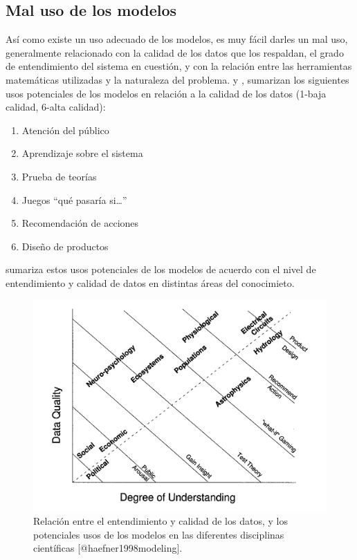 \documentclass[
]{book}
\providecommand{\tightlist}{%
  \setlength{\itemsep}{0pt}\setlength{\parskip}{0pt}}
\begin{document}
\hypertarget{mal-uso-de-los-modelos}{%
\subsection{Mal uso de los modelos}\label{mal-uso-de-los-modelos}}

Así como existe un uso adecuado de los modelos, es muy fácil darles un mal uso, generalmente relacionado con la calidad de los datos que los respaldan, el grado de entendimiento del sistema en cuestión, y con la relación entre las herramientas matemáticas utilizadas y la naturaleza del problema. \citet{holling1978adaptive} y \citet{karplus1975place}, sumarizan los siguientes usos potenciales de los modelos en relación a la calidad de los datos (1-baja calidad, 6-alta calidad):

\begin{enumerate}
\def\labelenumi{\arabic{enumi}.}
\tightlist
\item
  Atención del público
\item
  Aprendizaje sobre el sistema
\item
  Prueba de teorías
\item
  Juegos ``qué pasaría si\ldots{}''
\item
  Recomendación de acciones
\item
  Diseño de productos
\end{enumerate}

\citet{haefner1998modeling} sumariza estos usos potenciales de los modelos de acuerdo con el nivel de entendimiento y calidad de datos en distintas áreas del conocimieto.

\begin{figure}

{\centering \includegraphics[width=17.99in]{Unidad-I/uso-modelos} 

}

\caption{Relación entre el entendimiento y calidad de los datos, y los potenciales usos de los modelos en las diferentes disciplinas científicas [@haefner1998modeling].}\label{fig:unnamed-chunk-17}
\end{figure}
\end{document}
